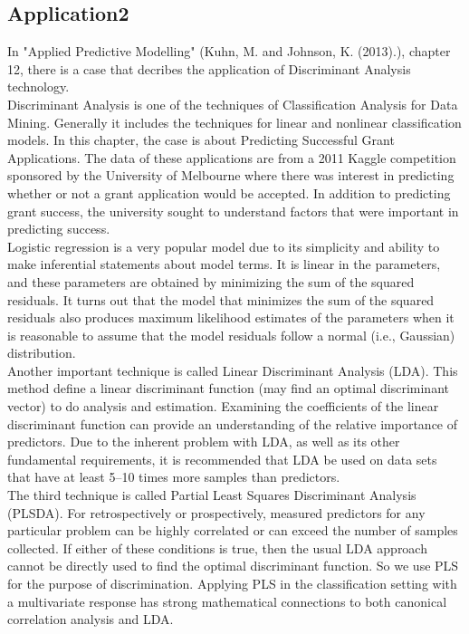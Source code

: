 \documentclass{article}%
\begin{document}
\subsection{Application2}
In "Applied Predictive Modelling" (Kuhn, M. and Johnson, K. (2013).), chapter 12, there is a case that decribes the application of Discriminant Analysis technology. \\
\indent Discriminant Analysis is one of the techniques of Classification Analysis for Data Mining. Generally it includes the techniques for linear and nonlinear classification models. In this chapter, the case is about Predicting Successful Grant Applications. The data of these applications are from a 2011 Kaggle competition sponsored by the University of Melbourne where there was interest in predicting whether or not a grant application would be accepted. In addition to predicting grant success, the university sought to understand factors that were important in predicting success.\\
\indent Logistic regression is a very popular model due to its simplicity and ability to make inferential statements about model terms. It is linear in the parameters, and these parameters are obtained by minimizing the sum of the squared residuals. It turns out that the model that minimizes the sum of the squared residuals also produces maximum likelihood estimates of the parameters when it is reasonable to assume that the model residuals follow a normal (i.e., Gaussian) distribution. \\
\indent Another important technique is called Linear Discriminant Analysis (LDA). This method define a linear discriminant function (may find an optimal discriminant vector) to do analysis and estimation. Examining the coefficients of the linear discriminant function can provide an understanding of the relative importance of predictors. Due to the inherent problem with LDA, as well as its other fundamental requirements, it is recommended that LDA be used on data sets that have at least 5–10 times more samples than predictors.\\
\indent The third technique is called Partial Least Squares Discriminant Analysis (PLSDA). For retrospectively or prospectively, measured predictors for any particular problem can be highly correlated or can exceed the number of samples collected. If either of these conditions is true, then the usual LDA approach cannot be directly used to find the optimal discriminant function. So we use PLS for the purpose of discrimination. Applying PLS in the classification setting with a multivariate response has strong mathematical connections to both canonical correlation analysis and LDA.\\
\end{document}

